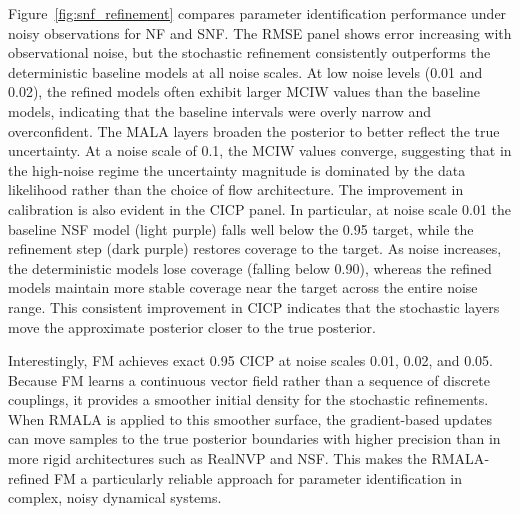 Figure~\ref{fig:snf_refinement} compares parameter identification performance under noisy observations for \ac{NF} and \ac{SNF}. The RMSE panel shows error increasing with observational noise, but the stochastic refinement consistently outperforms the deterministic baseline models at all noise scales. At low noise levels (0.01 and 0.02), the refined models often exhibit larger MCIW values than the baseline models, indicating that the baseline intervals were overly narrow and overconfident. The \ac{MALA} layers broaden the posterior to better reflect the true uncertainty. At a noise scale of 0.1, the MCIW values converge, suggesting that in the high-noise regime the uncertainty magnitude is dominated by the data likelihood rather than the choice of flow architecture. The improvement in calibration is also evident in the CICP panel. In particular, at noise scale 0.01 the baseline \ac{NSF} model (light purple) falls well below the 0.95 target, while the refinement step (dark purple) restores coverage to the target. As noise increases, the deterministic models lose coverage (falling below 0.90), whereas the refined models maintain more stable coverage near the target across the entire noise range. This consistent improvement in CICP indicates that the stochastic layers move the approximate posterior closer to the true posterior.

Interestingly, \ac{FM} achieves exact 0.95 CICP at noise scales 0.01, 0.02, and 0.05. Because \ac{FM} learns a continuous vector field rather than a sequence of discrete couplings, it provides a smoother initial density for the stochastic refinements. When \ac{RMALA} is applied to this smoother surface, the gradient-based updates can move samples to the true posterior boundaries with higher precision than in more rigid architectures such as \ac{RealNVP} and \ac{NSF}. This makes the \ac{RMALA}-refined \ac{FM} a particularly reliable approach for parameter identification in complex, noisy dynamical systems.